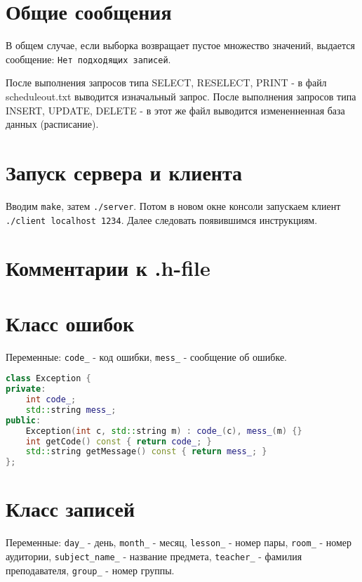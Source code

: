 \documentclass{article}
\begin{document}
\section*{Общие сообщения}
В общем случае, если выборка возвращает пустое множество значений, выдается сообщение: \texttt{Нет подходящих записей}.


После выполнения запросов типа SELECT, RESELECT, PRINT - в файл scheduleout.txt выводится изначальный запрос. После выполнения запросов типа INSERT, UPDATE, DELETE - в этот же файл выводится измененненная база данных (расписание).

\section*{Запуск сервера и клиента}
Вводим \texttt{make}, затем \texttt{./server}. Потом в новом окне консоли запускаем клиент \texttt{./client localhost 1234}. Далее следовать появившимся инструкциям.



\section*{Комментарии к .h-file}



\section*{Класс ошибок}

Переменные: \texttt{code\_} - код ошибки, \texttt{mess\_} - сообщение об ошибке.

\begin{lstlisting}[language=C++]
class Exception {
private:
    int code_;
    std::string mess_;
public:
    Exception(int c, std::string m) : code_(c), mess_(m) {}
    int getCode() const { return code_; }
    std::string getMessage() const { return mess_; }
};
\end{lstlisting}

\begin{comment}
using Value = std::variant<int, double, std::string>;
\end{comment}

\section*{Класс записей}

Переменные: \texttt{day\_} - день, \texttt{month\_} - месяц, \texttt{lesson\_} - номер пары, \texttt{room\_} - номер аудитории, \texttt{subject\_name\_} - название предмета, \texttt{teacher\_} - фамилия преподавателя, \texttt{group\_} - номер группы.
\end{document}
